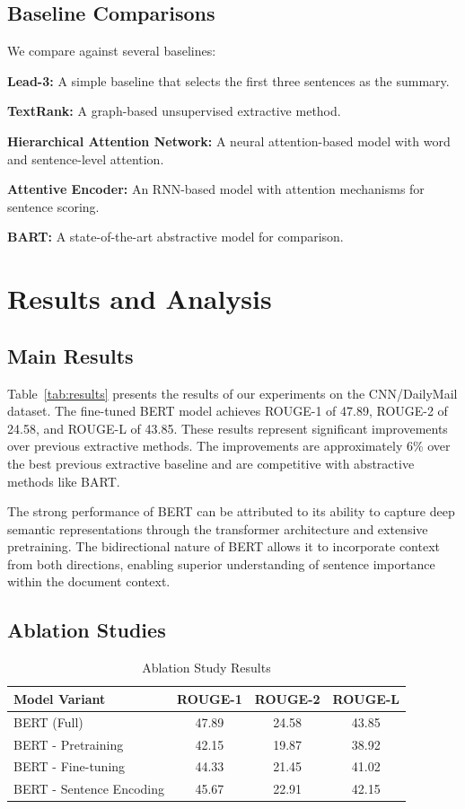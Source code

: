\documentclass[conference]{IEEEtran}
\begin{document}
\subsection{Baseline Comparisons}

We compare against several baselines:

\noindent\textbf{Lead-3:} A simple baseline that selects the first three sentences as the summary.

\noindent\textbf{TextRank:} A graph-based unsupervised extractive method.

\noindent\textbf{Hierarchical Attention Network:} A neural attention-based model with word and sentence-level attention.

\noindent\textbf{Attentive Encoder:} An RNN-based model with attention mechanisms for sentence scoring.

\noindent\textbf{BART:} A state-of-the-art abstractive model for comparison.

\section{Results and Analysis}

\subsection{Main Results}

Table~\ref{tab:results} presents the results of our experiments on the CNN/DailyMail dataset. The fine-tuned BERT model achieves ROUGE-1 of 47.89, ROUGE-2 of 24.58, and ROUGE-L of 43.85. These results represent significant improvements over previous extractive methods. The improvements are approximately 6\% over the best previous extractive baseline and are competitive with abstractive methods like BART.

The strong performance of BERT can be attributed to its ability to capture deep semantic representations through the transformer architecture and extensive pretraining. The bidirectional nature of BERT allows it to incorporate context from both directions, enabling superior understanding of sentence importance within the document context.

\subsection{Ablation Studies}

\begin{table}[h]
\centering
\caption{Ablation Study Results}
\label{tab:ablation}
\begin{tabular}{|l|c|c|c|}
\hline
\textbf{Model Variant} & \textbf{ROUGE-1} & \textbf{ROUGE-2} & \textbf{ROUGE-L} \\
\hline
BERT (Full) & 47.89 & 24.58 & 43.85 \\
\hline
BERT - Pretraining & 42.15 & 19.87 & 38.92 \\
\hline
BERT - Fine-tuning & 44.33 & 21.45 & 41.02 \\
\hline
BERT - Sentence Encoding & 45.67 & 22.91 & 42.15 \\
\hline
\end{tabular}
\end{table}
\end{document}
